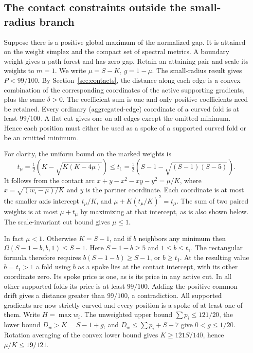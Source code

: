 \documentclass[11pt,a4paper]{article}
\theoremstyle{definition}
\begin{document}
\subsection{The contact constraints outside the small-radius branch}
Suppose there is a positive global maximum of the normalized gap.
It is attained on the weight simplex and the compact set of spectral
metrics. A boundary weight gives a path forest and has zero gap. Retain
an attaining pair and scale its weights to $m=1$. We write
$\mu=S-K$, $g=1-\mu$. The small-radius result gives $P<99/100$. By
Section~\ref{sec:contacts}, the distance along each edge is a convex
combination of the corresponding coordinates of the active supporting
gradients, plus the same $\delta>0$. The coefficient sum is one and only
positive coefficients need be retained. Every ordinary (aggregated-edge)
coordinate of a curved fold is at least $99/100$. A flat cut gives one
on all edges except the omitted minimum. Hence each position must either
be used as a spoke of a supported curved fold or be an omitted minimum.

For clarity, the uniform bound on the marked weights is
\[
 t_\mu=\tfrac12(K-\sqrt{K(K-4\mu)})\le t_1
 =\tfrac12(S-1-\sqrt{(S-1)(S-5)}).
\]
It follows from the contact arc
$x+y-x^2-xy-y^2=\mu/K$, where $x=\sqrt{(w_i-\mu)/K}$ and $y$ is
the partner coordinate. Each coordinate is at most the smaller axis
intercept $t_\mu/K$, and $\mu+K(t_\mu/K)^2=t_\mu$.
The sum of two paired weights is at most $\mu+t_\mu$ by maximizing
at that intercept, as is also shown below. The scale-invariant cut
bound gives $\mu\le1$.

In fact $\mu<1$. Otherwise $K=S-1$, and if $b$ neighbors any minimum
then $\Omega(S-1-b,b,1)\le S-1$. Here $S-1-b\ge5$ and $1\le b\le t_1$.
The rectangular formula therefore requires $b(S-1-b)\ge S-1$, or
$b\ge t_1$. At the resulting value $b=t_1>1$ a fold using $b$ as
a spoke lies at the contact intercept, with its other coordinate zero.
Its spoke price is one, as is its price in any active cut. In all other
supported folds its price is at least $99/100$. Adding the positive
common drift gives a distance greater than $99/100$, a contradiction.
All supported gradients are now strictly curved and every position is a
spoke of at least one of them. Write $H=\max w_i$. The unweighted
upper bound $\sum p_i\le121/20$, the lower bound $D_w>K=S-1+g$,
and $D_w\le\sum p_i+S-7$ give $0<g\le1/20$. Rotation averaging of
the convex lower bound gives $K\ge121S/140$, hence $\mu/K\le19/121$.
\end{document}
